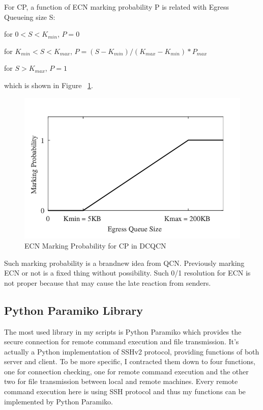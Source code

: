 \documentclass[12pt,a4paper]{article}
\begin{document}
For CP, a function of ECN marking probability P is related with Egress Queueing size S:

for $0<S<K_{min}$, $P = 0$

for $K_{min}<S<K_{max}$, $P = (S - K_{min})/(K_{max} - K_{min})*P_{max}$

for $S>K_{max}$, $P = 1$

which is shown in Figure ~\ref{fig:ECNMarking}.

\begin{figure}[h!]
	\begin{center}
		\includegraphics[width=5in]{ECNMarking}
		\caption{ECN Marking Probability for CP in DCQCN}
		\label{fig:ECNMarking}
	\end{center}
\end{figure}

Such marking probability is a brandnew idea from QCN.
Previously marking ECN or not is a fixed thing without possibility.
Such 0/1 resolution for ECN is not proper because that may cause the late reaction from senders.

\subsection{Python Paramiko Library}

The most used library in my scripts is Python Paramiko
which provides the secure connection for remote command execution and file transmission.
It's actually a Python implementation of SSHv2 protocol, providing functions of both server and client.
To be more specific, I contracted them down to four functions, one for connection checking,
one for remote command execution and the other two for file transmission between local and remote machines.
Every remote command execution here is using SSH protocol and thus my functions can be implemented by Python Paramiko.
\end{document}
